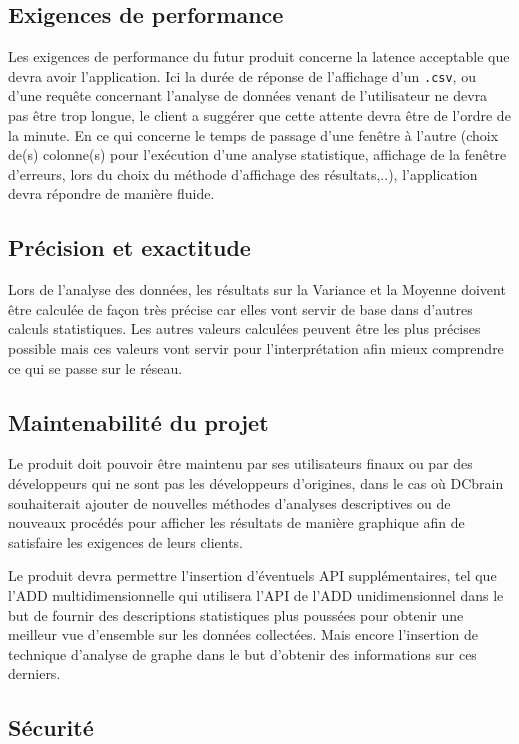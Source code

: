 		\subsection{Exigences de performance} 

		Les exigences de performance du futur produit concerne la latence acceptable que devra avoir l'application. Ici la durée de réponse de l’affichage d’un \lstinline!.csv!, ou d’une requête concernant l’analyse de données venant de l’utilisateur ne devra pas être trop longue, le client a suggérer que cette attente devra être de l’ordre de la minute. En ce qui concerne le temps de passage d'une fenêtre à l'autre (choix de(s) colonne(s) pour l'exécution d'une analyse statistique, affichage de la fenêtre d'erreurs, lors du choix du méthode d’affichage des résultats,..), l’application devra répondre de manière fluide. 

		\subsection{Précision et exactitude}
			Lors de l'analyse des données, les résultats sur la Variance et la Moyenne doivent être calculée de façon très précise car elles vont servir de base dans d’autres calculs statistiques. Les autres valeurs calculées peuvent être les plus précises possible mais ces valeurs vont servir pour l'interprétation afin mieux comprendre ce qui se passe sur le réseau.

		\subsection{Maintenabilité du projet}
		Le produit doit pouvoir être maintenu par ses utilisateurs finaux ou par des développeurs qui ne sont pas les développeurs d’origines, dans le cas où DCbrain souhaiterait ajouter de nouvelles méthodes d’analyses descriptives ou de nouveaux procédés pour afficher les résultats de manière graphique afin de satisfaire les exigences de leurs clients.\newline
		
		Le produit devra permettre l'insertion d'éventuels API supplémentaires, tel que l'ADD multidimensionnelle qui utilisera l'API de l'ADD unidimensionnel dans le but de fournir des descriptions statistiques plus poussées pour obtenir une meilleur vue d'ensemble sur les données collectées. Mais encore l'insertion de technique d'analyse de graphe dans le but d'obtenir des informations sur ces derniers.
		
		\subsection{Sécurité} 
